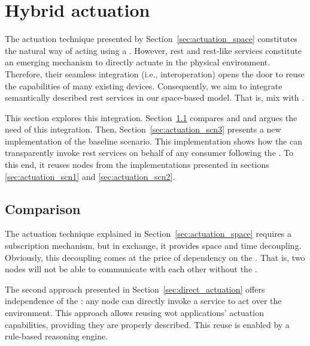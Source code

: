 \section{Hybrid actuation}
\label{sec:hybrid_actuation}

The actuation technique presented by Section~\ref{sec:actuation_space} constitutes the natural way of acting using a \Space{}.
However, \ac{rest} and \ac{rest}-like services constitute an emerging mechanism to directly actuate in the physical environment.
Therefore, their seamless integration (i.e., interoperation) opens the door to reuse the capabilities of many existing devices.
Consequently, we aim to integrate semantically described \ac{rest} services in our space-based model. %
That is, mix \spaceActuation{} with \restActuation{}.


This section explores this integration.
Section~\ref{sec:actuation_comparison} compares \spaceActuation{} and \restActuation{} and argues the need of this integration.
Then, Section~\ref{sec:actuation_scn3} presents a new implementation of the baseline scenario.
This implementation shows how the \Space{} can transparently invoke \ac{rest} services on behalf of any consumer following the \spaceActuation{}.
To this end, it reuses nodes from the implementations presented in sections \ref{sec:actuation_scn1} and \ref{sec:actuation_scn2}.


\subsection{Comparison}
\label{sec:actuation_comparison}

The actuation technique explained in Section~\ref{sec:actuation_space} requires a subscription mechanism, but in exchange, it provides space and time decoupling.
Obviously, this decoupling comes at the price of dependency on the \Space{}.
That is, two nodes will not be able to communicate with each other without the \Space{}.


The second approach presented in Section~\ref{sec:direct_actuation} offers independence of the \Space{}: any node can directly invoke a service to act over the environment.
This approach allows reusing \ac{wot} applications' actuation capabilities, providing they are properly described. %
This reuse is enabled by a rule-based reasoning engine. %


